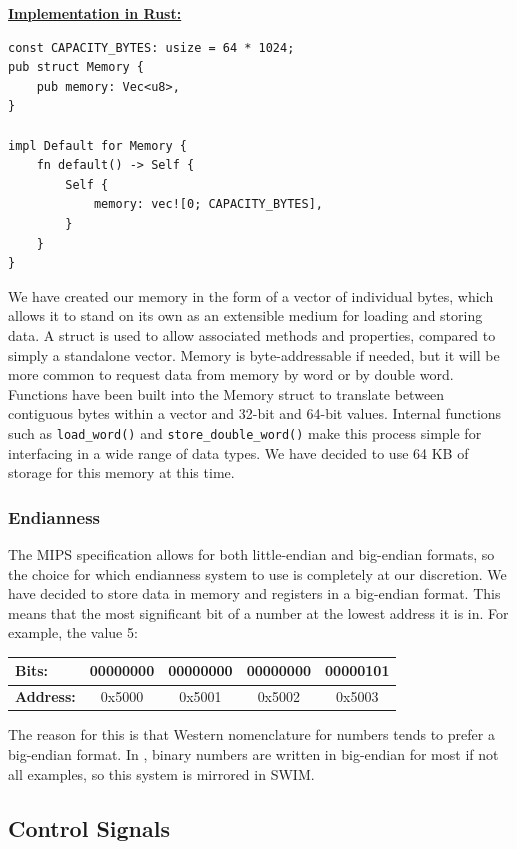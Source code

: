 \documentclass[
    paper=letter,
    parskip=half,
    fontsize=12pt,
    titlepage=firstiscover,
    toc=bibliography,
    numbers=endperiod
]{scrartcl}
\begin{document}
\underline{\textbf{Implementation in Rust:}}
\begin{verbatim}
const CAPACITY_BYTES: usize = 64 * 1024;
pub struct Memory {
    pub memory: Vec<u8>,
}

impl Default for Memory {
    fn default() -> Self {
        Self {
            memory: vec![0; CAPACITY_BYTES],
        }
    }
}
\end{verbatim}

We have created our memory in the form of a vector of individual bytes,
which allows it to stand on its own as an extensible medium for loading
and storing data. A struct is used to allow associated methods and
properties, compared to simply a standalone vector. Memory is
byte-addressable if needed, but it will be more common to request data
from memory by word or by double word. Functions have been built into
the Memory struct to translate between contiguous bytes within a vector
and 32-bit and 64-bit values. Internal functions such as
\texttt{load\_word()} and \texttt{store\_double\_word()} make this
process simple for interfacing in a wide range of data types. We have
decided to use 64 KB of storage for this memory at this time.

\subsubsection{Endianness}

The MIPS specification allows for both little-endian and big-endian
formats, so the choice for which endianness system to use is completely
at our discretion. We have decided to store data in memory and registers
in a big-endian format. This means that the most significant bit of a
number at the lowest address it is in. For example, the value 5:

\begin{tabularx}{\textwidth}{|l|c|c|c|c|}
    \hline
    \textbf{Bits:}    & 00000000 & 00000000 & 00000000 & 00000101 \\\hline
    \textbf{Address:} & 0x5000   & 0x5001   & 0x5002   & 0x5003   \\\hline
\end{tabularx}

The reason for this is that Western nomenclature for numbers tends to
prefer a big-endian format. In \cite{hennessy-patterson}, binary numbers
are written in big-endian for most if not all examples, so this system
is mirrored in SWIM.

\subsection{Control Signals}
\label{subsec:control-signals}
\end{document}
